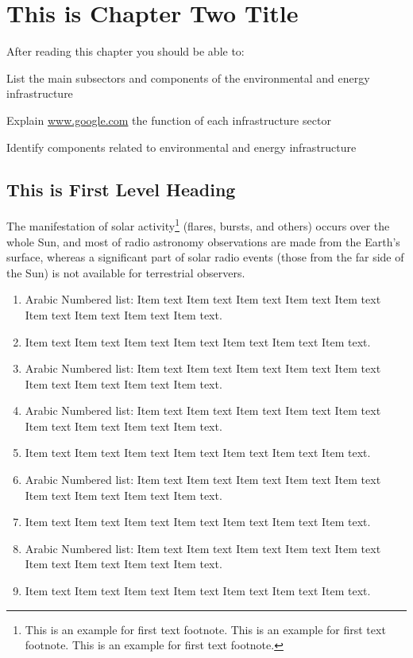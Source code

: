 
\chapter{This is Chapter Two Title}

After reading this chapter you should be able to:

\begin{objectives}
\item List the main subsectors and components of the environmental and energy infrastructure

\item Explain \url{www.google.com} the function of each infrastructure sector

\item Identify components related to environmental and energy infrastructure
\end{objectives}

\section{This is First Level Heading}

\lipsum[1-2]

The manifestation of solar activity\footnote{This is an example for first text footnote. This is an example for first text footnote. This is an example for first text footnote.} (flares, bursts, and others) occurs over the whole Sun, and most of radio astronomy observations are made from the Earth's surface, whereas a significant part of solar radio events (those from the far side of the Sun) is not available for terrestrial observers.
\begin{enumerate}[1.]
\item Arabic Numbered list: Item text  Item text  Item text  Item text  Item text  
Item text Item text Item text  Item text. 
\item Item text  Item text  Item text  Item text  Item text  Item text  Item text.
\item Arabic Numbered list: Item text  Item text  Item text  Item text  Item text  
Item text Item text Item text  Item text. 
\item Arabic Numbered list: Item text  Item text  Item text  Item text  Item text  
Item text Item text Item text  Item text. 
\item Item text  Item text  Item text  Item text  Item text  Item text  Item text.
\item Arabic Numbered list: Item text  Item text  Item text  Item text  Item text  
Item text Item text Item text  Item text. 
\item Item text  Item text  Item text  Item text  Item text  Item text  Item text.
\item Arabic Numbered list: Item text  Item text  Item text  Item text  Item text 
Item text Item text Item text  Item text. 
\item Item text  Item text  Item text  Item text  Item text  Item text  Item text.
\end{enumerate}

